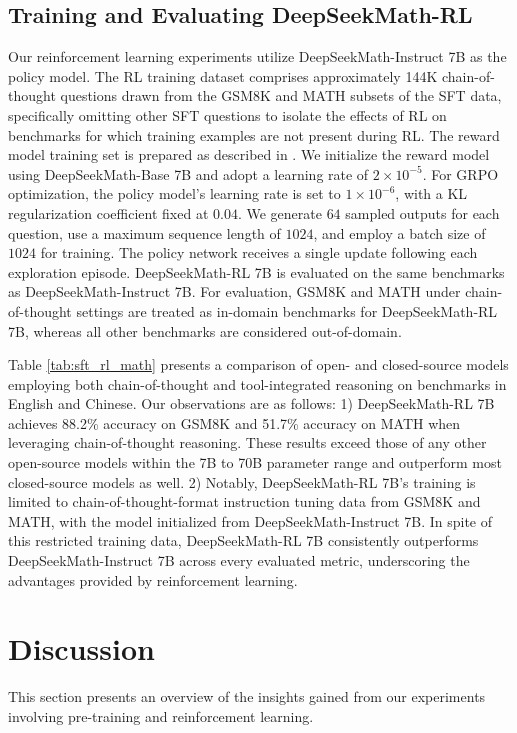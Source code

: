 \begin{itemize}[topsep=0pt]
\begin{itemize}[topsep=0pt]
\subsection{Training and Evaluating DeepSeekMath-RL}

Our reinforcement learning experiments utilize DeepSeekMath-Instruct 7B as the policy model. The RL training dataset comprises approximately 144K chain-of-thought questions drawn from the GSM8K and MATH subsets of the SFT data, specifically omitting other SFT questions to isolate the effects of RL on benchmarks for which training examples are not present during RL. The reward model training set is prepared as described in \citep{wang2023math}. We initialize the reward model using DeepSeekMath-Base 7B and adopt a learning rate of $2 \times 10^{-5}$. For GRPO optimization, the policy model’s learning rate is set to $1 \times 10^{-6}$, with a KL regularization coefficient fixed at $0.04$. We generate $64$ sampled outputs for each question, use a maximum sequence length of $1024$, and employ a batch size of $1024$ for training. The policy network receives a single update following each exploration episode. DeepSeekMath-RL 7B is evaluated on the same benchmarks as DeepSeekMath-Instruct 7B. For evaluation, GSM8K and MATH under chain-of-thought settings are treated as in-domain benchmarks for DeepSeekMath-RL 7B, whereas all other benchmarks are considered out-of-domain.

Table \ref{tab:sft_rl_math} presents a comparison of open- and closed-source models employing both chain-of-thought and tool-integrated reasoning on benchmarks in English and Chinese. Our observations are as follows: 1) DeepSeekMath-RL 7B achieves 88.2\% accuracy on GSM8K and 51.7\% accuracy on MATH when leveraging chain-of-thought reasoning. These results exceed those of any other open-source models within the 7B to 70B parameter range and outperform most closed-source models as well. 2) Notably, DeepSeekMath-RL 7B’s training is limited to chain-of-thought-format instruction tuning data from GSM8K and MATH, with the model initialized from DeepSeekMath-Instruct 7B. In spite of this restricted training data, DeepSeekMath-RL 7B consistently outperforms DeepSeekMath-Instruct 7B across every evaluated metric, underscoring the advantages provided by reinforcement learning.

\section{Discussion}
This section presents an overview of the insights gained from our experiments involving pre-training and reinforcement learning.


\end{itemize}
\end{itemize}
